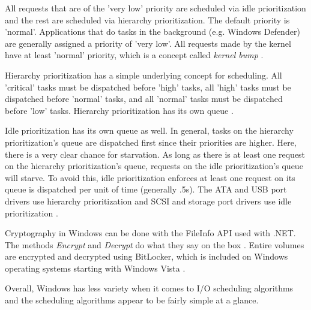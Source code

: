\documentclass[10pt,draftclsnofoot,onecolumn,journal,compsoc]{IEEEtran}
\begin{document}
All requests that are of the 'very low' priority are scheduled via idle prioritization and the rest are scheduled via hierarchy prioritization. The default priority is 'normal'. Applications that do tasks in the background (e.g. Windows Defender) are generally assigned a priority of 'very low'. All requests made by the kernel have at least 'normal' priority, which is a concept called \textit{kernel bump} \cite{winint}.

Hierarchy prioritization has a simple underlying concept for scheduling. All 'critical' tasks must be dispatched before 'high' tasks, all 'high' tasks must be dispatched before 'normal' tasks, and all 'normal' tasks must be dispatched before 'low' tasks. Hierarchy prioritization has its own queue \cite{winint}.

Idle prioritization has its own queue as well. In general, tasks on the hierarchy prioritization's queue are dispatched first since their priorities are higher. Here, there is a very clear chance for starvation. As long as there is at least one request on the hierarchy prioritization's queue, requests on the idle prioritization's queue will starve. To avoid this, idle prioritization enforces at least one request on its queue is dispatched per unit of time (generally .5s). The ATA and USB port drivers use hierarchy prioritization and SCSI and storage port drivers use idle prioritization \cite{winint}. 

Cryptography in Windows can be done with the FileInfo API used with .NET. The methods \textit{Encrypt} and \textit{Decrypt} do what they say on the box \cite{wincrypt}. Entire volumes are encrypted and decrypted using BitLocker, which is included on Windows operating systems starting with Windows Vista \cite{wincrypt2}.

Overall, Windows has less variety when it comes to I/O scheduling algorithms and the scheduling algorithms appear to be fairly simple at a glance.


\newpage
\end{document}
